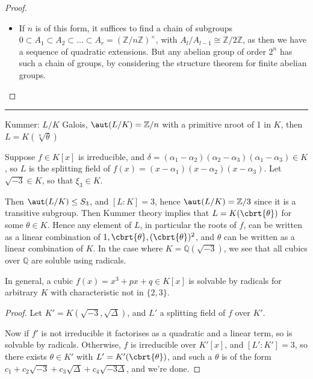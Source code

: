 \documentclass[a4paper, 10pt, twocolumn]{amsart}
\begin{document}
\begin{enumerate}
\begin{enumerate}
\begin{proof}
\begin{itemize}
So $n = 2^k p_1\ldots p_r$ with $p_i$ distinct primes, since the $\alpha_i \leq 1$. Moreover, these $p_i$ must be one more than a power of $2$, so $p_i = 2^m + 1$. But this implies that $m$ must also be a power of $2$ - check this.

\item[\underline{$\impliedby$:}] If $n$ is of this form, it suffices to find a chain of subgroups $0 \subset A_1 \subset A_2 \subset \ldots \subset A_r = (\mathbb{Z}/n\mathbb{Z})^{\times}$, with $A_l/A_{l-1} \cong \mathbb{Z}/2\mathbb{Z}$, as then we have a sequence of quadratic extensions. But any abelian group of order $2^n$ has such a chain of groups, by considering the structure theorem for finite abelian groups.
\end{itemize}
\end{proof}
\end{enumerate}
\end{enumerate}
\hrule
Kummer: $L/K$ Galois, $\aut(L/K) = \mathbb{Z}/n$ with a primitive n\th root of 1 in $K$, then $L = K(\sqrt[n]{\theta})$

Suppose $f \in K[x]$ is irreducible, and $\delta = (\alpha_1-\alpha_2)(\alpha_2-\alpha_3)(\alpha_1-\alpha_3) \in K$, so $L$ is the splitting field of $f(x) = (x-\alpha_1)(x-\alpha_2)(x-\alpha_3)$. Let $\sqrt{-3} \in K$, so that $\xi_3 \in K$.

Then $\aut(L/K) \leq S_3$, and $[L:K] = 3$, hence $\aut(L/K) = \mathbb{Z}/3$ since it is a transitive subgroup. Then Kummer theory implies that $L = K(\cbrt{\theta})$ for some $\theta \in K$. Hence any element of $L$, in particular the roots of $f$, can be written as a linear combination of $1, \cbrt{\theta}, (\cbrt{\theta})^2$, and $\theta$ can be written as a linear combination of $K$. In the case where $K = \mathbb{Q}(\sqrt{-3})$, we see that all cubics over $\mathbb{Q}$ are soluble using radicals.

In general, a cubic $f(x) = x^3 + px + q \in K[x]$ is solvable by radicals for arbitrary $K$ with characteristic not in $\{2,3\}$.

\begin{proof}
Let $K' = K(\sqrt{-3}, \sqrt{\Delta})$, and $L'$ a splitting field of $f$ over $K'$.

Now if $f'$ is not irreducible it factorises as a quadratic and a linear term, so is solvable by radicals. Otherwise, $f$ is irreducible over $K'[x]$, and $[L':K'] = 3$, so there exists $\theta \in K'$ with $L' = K'(\cbrt{\theta})$, and such a $\theta$ is of the form $c_1 + c_2\sqrt{-3} +c_3\sqrt{\Delta} + c_4\sqrt{-3\Delta}$, and we're done.
\end{proof}
\end{document}

